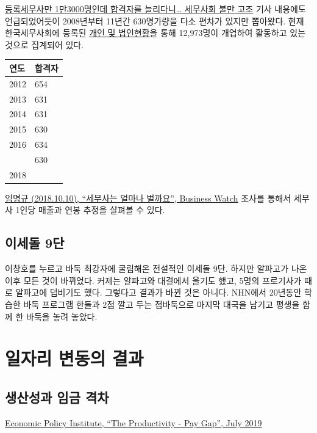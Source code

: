 \documentclass[smallextended]{svjour3}       %
\begin{document}
\href{http://biz.newdaily.co.kr/site/data/html/2019/01/22/2019012200053.html}{등록세무사만
1만3000명인데 합격자를 늘리다니\ldots{} 세무사회 불만 고조} 기사
내용에도 언급되었어듯이 2008년부터 11년간 630명가량을 다소 편차가 있지만
뽑아왔다. 현재 한국세무사회에 등록된
\href{http://www.kacpta.or.kr/}{개인 및 법인현황}을 통해 12,973명이
개업하여 활동하고 있는 것으로 집계되어 있다.

\begin{tabular}{ll}
\toprule
연도 & 합격자\\
\midrule
2012 & 654\\
2013 & 631\\
2014 & 631\\
2015 & 630\\
2016 & 634\\
\addlinespace
2017 & 630\\
2018 & \\
\bottomrule
\end{tabular}

\href{http://news.bizwatch.co.kr/article/tax/2018/10/05/0010}{임명규
(2018.10.10), ``세무사는 얼마나 벌까요'', Business Watch} 조사를 통해서
세무사 1인당 매출과 연봉 추정을 살펴볼 수 있다.

\hypertarget{play-go}{%
\subsection{\texorpdfstring{이세돌 9단
\cite{zdnet_2019}}{이세돌 9단 }}\label{play-go}}

이창호를 누르고 바둑 최강자에 굴림해온 전설적인 이세돌 9단. 하지만
알파고가 나온 이후 모든 것이 바뀌었다. 커제는 알파고와 대결에서 울기도
했고, 5명의 프로기사가 때로 알파고에 덥비기도 했다. 그렇다고 결과가 바뀐
것은 아니다. NHN에서 20년동안 학습한 바둑 프로그램 한돌과 2점 깔고 두는
접바둑으로 마지막 대국을 남기고 평생을 함께 한 바둑을 놓려 놓았다.

\hypertarget{wage-productivity-result}{%
\section{일자리 변동의 결과}\label{wage-productivity-result}}

\hypertarget{wage-productivity-gap}{%
\subsection{생산성과 임금 격차}\label{wage-productivity-gap}}

\href{https://www.epi.org/productivity-pay-gap/}{Economic Policy
Institute, ``The Productivity - Pay Gap'', July 2019}
\end{document}

